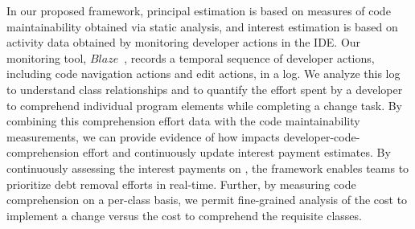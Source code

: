 In our proposed framework, principal estimation is based on measures of code maintainability obtained via static analysis, and interest estimation is based on activity data obtained by monitoring developer actions in the IDE. Our monitoring tool, $Blaze$~\cite{Snipes_etal:2014}, records a temporal sequence of developer actions, including code navigation actions and edit actions, in a log. We analyze this log to understand class relationships and to quantify the effort spent by a developer to comprehend individual program elements while completing a change task. By combining this comprehension effort data with the code maintainability measurements, we can provide evidence of how \TD impacts developer-code-comprehension effort and continuously update interest payment estimates.
By continuously assessing the interest payments on \TD, the framework enables teams to prioritize debt removal efforts in real-time.  Further, by measuring code comprehension on a per-class basis, we permit fine-grained analysis of the cost to implement a change versus the cost to comprehend the requisite classes. %